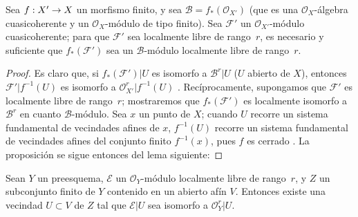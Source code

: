 \documentclass[oneside,10pt]{amsart}
\makeatletter
\newcommand{\ega@arrow}[2]{\mathchoice{#1}{#2}{#2}{#2}}
\renewcommand{\to}{\ega@arrow{\longrightarrow}{\rightarrow}}
\let\EGAOriginalLabel\label
\renewcommand{\label}[1]{\phantomsection\EGAOriginalLabel{#1}}
\makeatother
\begin{document}
\begin{proposition}[6.1.12]
\label{II.6.1.12-fr}
Sea $f:X'\to X$ un morfismo finito, y sea $\mathcal{B}=f_*(\mathcal{O}_{X'})$ (que es una $\mathcal{O}_X$-álgebra cuasicoherente y un $\mathcal{O}_X$-módulo de tipo finito).
Sea $\mathcal{F}'$ un $\mathcal{O}_{X'}$-módulo cuasicoherente;
para que $\mathcal{F}'$ sea localmente libre de rango~$r$, es necesario y suficiente que $f_*(\mathcal{F}')$ sea un $\mathcal{B}$-módulo localmente libre de rango~$r$.
\end{proposition}

\begin{proof}
Es claro que, si $f_*(\mathcal{F}')|U$ es isomorfo a $\mathcal{B}^r|U$ ($U$ abierto de $X$), entonces $\mathcal{F}'|f^{-1}(U)$ es isomorfo a $\mathcal{O}_{X'}^r|f^{-1}(U)$ .
Recíprocamente, supongamos que $\mathcal{F}'$ es localmente libre de rango~$r$; mostraremos que $f_*(\mathcal{F}')$ es localmente isomorfo a $\mathcal{B}^r$ en cuanto $\mathcal{B}$-módulo.
Sea $x$ un punto de $X$;
cuando $U$ recorre un sistema fundamental de vecindades afines de $x$, $f^{-1}(U)$ recorre un sistema fundamental de vecindades afines  del conjunto finito $f^{-1}(x)$, pues $f$ es cerrado .
La proposición se sigue entonces del lema siguiente:
\end{proof}

\begin{lemma}[6.1.12.1]
\label{II.6.1.12.1-fr}
Sean $Y$ un preesquema, $\mathcal{E}$ un $\mathcal{O}_Y$-módulo localmente libre de rango~$r$, y $Z$ un subconjunto finito de $Y$ contenido en un abierto afín $V$.
Entonces existe una vecindad $U\subset V$ de $Z$ tal que $\mathcal{E}|U$ sea isomorfo a $\mathcal{O}_Y^r|U$.
\end{lemma}
\end{document}
